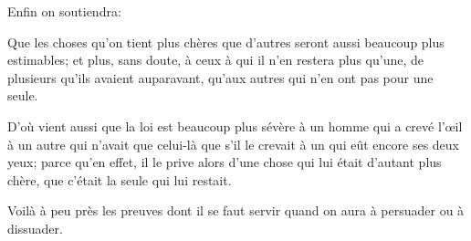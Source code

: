 \bigbreak

Enfin on soutiendra:

\begin{lieu}
  Que les choses qu'on tient plus chères que d'autres seront aussi beaucoup plus estimables; et plus, sans doute, à ceux à
  qui il n'en restera plus qu'une, de plusieurs qu'ils avaient auparavant, qu'aux autres qui n'en ont pas pour une seule.
\end{lieu}

D'où vient aussi que la loi est beaucoup plus sévère à un homme qui a crevé l'œil à un autre qui n'avait que celui-là que s'il
le crevait à un qui eût encore ses deux yeux; parce qu'en effet, il le prive alors d'une chose qui lui était d'autant plus chère,
que c'était la seule qui lui restait.

\bigbreak

Voilà à peu près les preuves dont il se faut servir quand on aura à persuader ou à dissuader.
